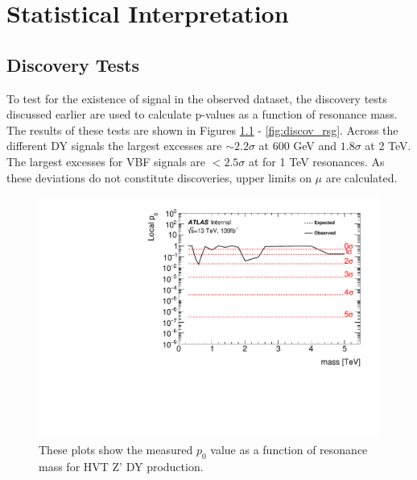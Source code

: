 \chapter{Statistical Interpretation}
\section{Discovery Tests}
To test for the existence of signal in the observed dataset, the discovery tests discussed earlier are used to calculate p-values as a function of resonance mass. The results of these tests are shown in Figures \ref{fig:discov_hvtww} - \ref{fig:discov_rsg}. Across the different DY signals the largest excesses are $\sim 2.2\sigma$ at 600 GeV and $1.8\sigma$ at 2 TeV. The largest excesses for VBF signals are $< 2.5\sigma$ at for 1 TeV resonances. As these deviations do not constitute discoveries, upper limits on $\mu$ are calculated.
 \begin{figure}[h!]
  \centering
  \includegraphics[width=\hsize]{figures/results/pvalues/fixed_pvalues/hvtww_pvalue.pdf}
 \caption{These plots show the measured $p_{0}$ value as a function of resonance mass for HVT Z' DY production.} 
  \label{fig:discov_hvtww}
\end{figure} 
\FloatBarrier

